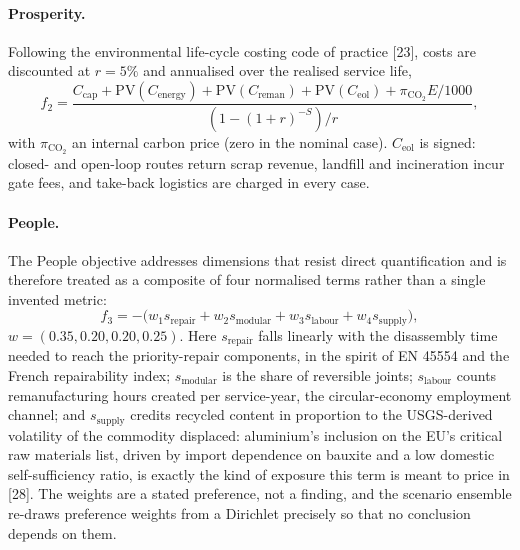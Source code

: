 \documentclass[11pt,a4paper]{article}
\begin{document}
\paragraph{Prosperity.} Following the environmental life-cycle costing code
of practice [23], costs are discounted at $r=5\%$ and annualised over
the realised service life,
\begin{equation}
f_2 = \frac{C_{\text{cap}} + \mathrm{PV}(C_{\text{energy}})
  + \mathrm{PV}(C_{\text{reman}}) + \mathrm{PV}(C_{\text{eol}})
  + \pi_{\mathrm{CO_2}} E / 1000}
  {\left(1 - (1+r)^{-S}\right)/r},
\end{equation}
with $\pi_{\mathrm{CO_2}}$ an internal carbon price (zero in the nominal case).
$C_{\text{eol}}$ is signed: closed- and open-loop routes return scrap revenue,
landfill and incineration incur gate fees, and take-back logistics are charged
in every case.

\paragraph{People.} The People objective addresses dimensions that resist
direct quantification and is therefore treated as a composite of four
normalised terms rather than a single invented metric:
\begin{equation}
f_3 = -\Big(w_1 s_{\text{repair}} + w_2 s_{\text{modular}}
  + w_3 s_{\text{labour}} + w_4 s_{\text{supply}}\Big),
\end{equation}
$w = (0.35, 0.20, 0.20, 0.25)$. Here $s_{\text{repair}}$ falls linearly with
the disassembly time needed to reach the priority-repair components, in the
spirit of EN 45554 and the French repairability index; $s_{\text{modular}}$ is
the share of reversible joints; $s_{\text{labour}}$ counts remanufacturing
hours created per service-year, the circular-economy employment channel; and
$s_{\text{supply}}$ credits recycled content in proportion to the USGS-derived
volatility of the commodity displaced: aluminium's inclusion on the EU's
critical raw materials list, driven by import dependence on bauxite and a low
domestic self-sufficiency ratio, is exactly the kind of exposure this term is
meant to price in [28]. The weights are a stated preference,
not a finding, and the scenario ensemble re-draws preference weights from a
Dirichlet precisely so that no conclusion depends on them.
\end{document}
